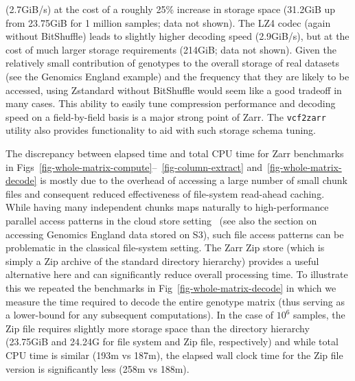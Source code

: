 \documentclass[a4paper,num-refs]{oup-contemporary}
\begin{document}
(2.7GiB/s) at the cost of a roughly 25\% increase in storage
space (31.2GiB up from 23.75GiB for 1 million samples; data not
shown). The LZ4 codec (again without BitShuffle) leads to slightly higher
decoding speed (2.9GiB/s), but at the cost of much larger storage requirements 
(214GiB; data not shown).
Given the relatively small contribution of genotypes to the
overall storage of real datasets (see the Genomics England example)
and the frequency that they are likely to be accessed, using 
Zstandard without BitShuffle 
would seem like a good tradeoff in many cases.
This ability to easily tune compression performance
and decoding speed on a field-by-field basis is a major strong
point of Zarr. The \texttt{vcf2zarr} utility also provides
functionality to aid with such storage schema tuning.

The discrepancy between elapsed time and total CPU time for Zarr 
benchmarks in
Figs~\ref{fig-whole-matrix-compute}--~\ref{fig-column-extract}
and~\ref{fig-whole-matrix-decode} is mostly due to the overhead
of accessing a large number of small chunk files and 
consequent reduced effectiveness of file-system read-ahead caching.
While having many independent chunks maps 
naturally to high-performance parallel access patterns
in the cloud store setting~\citep{durner2023exploiting} 
(see also the section on accessing Genomics England data stored on S3), 
such file access patterns can be problematic in the 
classical file-system setting.
The Zarr Zip store (which is simply a Zip archive of the standard directory 
hierarchy) provides a useful alternative here and can 
significantly reduce overall processing time. To illustrate this
we repeated the benchmarks in Fig~\ref{fig-whole-matrix-decode} in
which we measure the time required to decode the entire genotype
matrix (thus serving as a lower-bound for any subsequent computations).
In the case of $10^6$ samples, the Zip file requires slightly more 
storage space than the directory hierarchy (23.75GiB and 24.24G
for file system and Zip file, respectively)
and while total 
CPU time is similar (193m vs 187m), the elapsed wall clock
time for the Zip file version is significantly less 
(258m vs 188m).
\end{document}
